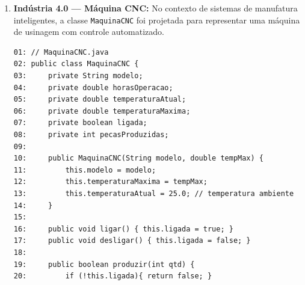 \documentclass[12pt,a4paper]{article}
\begin{document}
\begin{enumerate}
    \vspace{0.3cm}


    \item \textbf{Indústria 4.0 — Máquina CNC:} No contexto de sistemas de manufatura inteligentes, a classe \texttt{MaquinaCNC} foi projetada para representar uma máquina de usinagem com controle automatizado.

    \begin{center}
    \end{center}
\begin{small}
\begin{lstlisting}
01: // MaquinaCNC.java
02: public class MaquinaCNC {
03:     private String modelo;
04:     private double horasOperacao;
05:     private double temperaturaAtual;
06:     private double temperaturaMaxima;
07:     private boolean ligada;
08:     private int pecasProduzidas;
09: 
10:     public MaquinaCNC(String modelo, double tempMax) {
11:         this.modelo = modelo;
12:         this.temperaturaMaxima = tempMax;
13:         this.temperaturaAtual = 25.0; // temperatura ambiente
14:     }
15: 
16:     public void ligar() { this.ligada = true; }
17:     public void desligar() { this.ligada = false; }
18: 
19:     public boolean produzir(int qtd) {
20:         if (!this.ligada){ return false; }


\end{lstlisting}
\end{small}
\end{enumerate}
\end{document}
